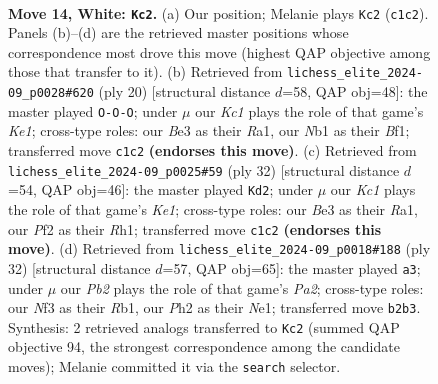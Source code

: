 \documentclass[11pt]{article}
\begin{document}
\clearpage

\begin{figure}[p]\centering
\begin{subfigure}{0.46\textwidth}\centering
\resizebox{\linewidth}{!}{%
\newchessgame
\chessboard[
  setfen={1rb1kb1r/1p3ppp/p1n1p3/4P3/n7/4BNP1/PP3P1P/RNK2B1R w k - 4 14},
  showmover=false,
  pgfstyle=straightmove, color=movearrow, markmove={c1-c2}
]}
\caption{}
\end{subfigure}\hfill
\begin{subfigure}{0.46\textwidth}\centering
\resizebox{\linewidth}{!}{%
\newchessgame
\chessboard[
  setfen={r4b1r/ppk2ppp/2p1bn2/4p3/2P1P3/4BP2/PP1N2PP/R3KB1R w KQ - 5 11},
  showmover=false,
  pgfstyle=straightmove, color=movearrow, markmove={e1-c1}
]}
\caption{}
\end{subfigure}
\\[4pt]
\begin{subfigure}{0.46\textwidth}\centering
\resizebox{\linewidth}{!}{%
\newchessgame
\chessboard[
  setfen={r1b1r1k1/pp3ppp/2p1nb2/3p4/3P4/2PBB3/PP2NPPP/R3K2R w KQ - 1 17},
  showmover=false,
  pgfstyle=straightmove, color=movearrow, markmove={e1-d2}
]}
\caption{}
\end{subfigure}\hfill
\begin{subfigure}{0.46\textwidth}\centering
\resizebox{\linewidth}{!}{%
\newchessgame
\chessboard[
  setfen={2k4r/p1pr1ppp/bp2pb2/8/1n2P1KP/4B1P1/PPP2PB1/1R2N2R w - - 13 17},
  showmover=false,
  pgfstyle=straightmove, color=movearrow, markmove={a2-a3}
]}
\caption{}
\end{subfigure}
\caption{\textbf{Move 14, White: \texttt{Kc2}.} (a) Our position; Melanie plays \texttt{Kc2} (\texttt{c1c2}). Panels (b)--(d) are the retrieved master positions whose correspondence most drove this move (highest QAP objective among those that transfer to it). (b) Retrieved from \texttt{lichess\_elite\_2024-09\_p0028\#620} (ply 20) [structural distance $d$=58, QAP obj=48]: the master played \texttt{O-O-O}; under $\mu$ our \emph{Kc1} plays the role of that game's \emph{Ke1}; cross-type roles: our \emph{B}e3 as their \emph{R}a1, our \emph{N}b1 as their \emph{B}f1; transferred move \texttt{c1c2} \textbf{(endorses this move)}. (c) Retrieved from \texttt{lichess\_elite\_2024-09\_p0025\#59} (ply 32) [structural distance $d$=54, QAP obj=46]: the master played \texttt{Kd2}; under $\mu$ our \emph{Kc1} plays the role of that game's \emph{Ke1}; cross-type roles: our \emph{B}e3 as their \emph{R}a1, our \emph{P}f2 as their \emph{R}h1; transferred move \texttt{c1c2} \textbf{(endorses this move)}. (d) Retrieved from \texttt{lichess\_elite\_2024-09\_p0018\#188} (ply 32) [structural distance $d$=57, QAP obj=65]: the master played \texttt{a3}; under $\mu$ our \emph{Pb2} plays the role of that game's \emph{Pa2}; cross-type roles: our \emph{N}f3 as their \emph{R}b1, our \emph{P}h2 as their \emph{N}e1; transferred move \texttt{b2b3}. Synthesis: 2 retrieved analogs transferred to \texttt{Kc2} (summed QAP objective 94, the strongest correspondence among the candidate moves); Melanie committed it via the \texttt{search} selector.}
\label{fig:thought-m26}
\end{figure}
\end{document}
